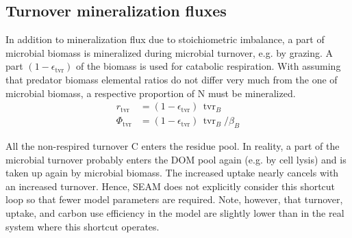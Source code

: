 \subsection{Turnover mineralization fluxes \label{sec:Tvr}}
In addition to mineralization flux due to stoichiometric imbalance, a part of
microbial biomass is mineralized during microbial turnover, e.g. by grazing. A
part $(1-\epsilon_{\operatorname{tvr}})$ of the biomass is used for catabolic
respiration. With assuming that predator biomass elemental ratios do not differ
very much from the one of microbial biomass, a respective proportion of N must
be mineralized.
\begin{subequations}
\label{eq:MinTvrB}
\begin{align} 
r_{\operatorname{tvr}} &= (1-\epsilon_{\operatorname{tvr}}) \,
\operatorname{tvr}_B
\\
\label{eq:PhiTvr}
\Phi_{\operatorname{tvr}} &=
(1-\epsilon_{\operatorname{tvr}}) \, \operatorname{tvr}_B / \beta_B
\end{align}
\end{subequations}

All the non-respired turnover C enters the residue pool. In reality, a part
of the microbial turnover probably enters the DOM pool again (e.g. by cell
lysis) and is taken up again by microbial biomass. The increased uptake nearly
cancels with an increased turnover. Hence, SEAM does not explicitly consider this
shortcut loop so that fewer model parameters are required.
Note, however, that turnover, uptake, and carbon use efficiency in the model are
slightly lower than in the real system where this shortcut operates.


